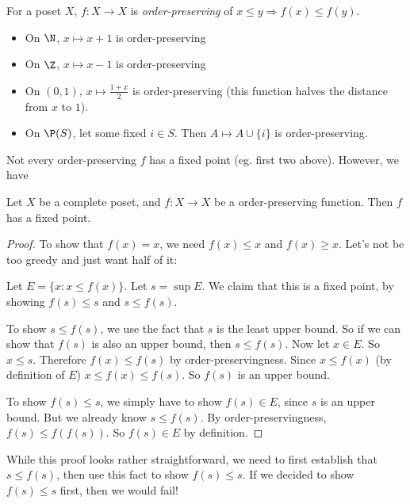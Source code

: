 \documentclass[a4paper]{article}
\begin{document}
\begin{defi}
  For a poset $X$, $f: X\to X$ is \emph{order-preserving} of $x \leq y \Rightarrow  f(x) \leq f(y)$.
\end{defi}

\begin{eg}\leavevmode
  \begin{itemize}
    \item On $\N$, $x\mapsto x + 1$ is order-preserving
    \item On $\Z$, $x\mapsto x - 1$ is order-preserving
    \item On $(0, 1)$, $x\mapsto \frac{1 + x}{2}$ is order-preserving (this function halves the distance from $x$ to $1$).
    \item On $\P(S)$, let some fixed $i\in S$. Then $A\mapsto A\cup \{i\}$ is order-preserving.
  \end{itemize}
\end{eg}
Not every order-preserving $f$ has a fixed point (eg. first two above). However, we have
\begin{thm}
  Let $X$ be a complete poset, and $f: X\to X$ be a order-preserving function. Then $f$ has a fixed point.
\end{thm}

\begin{proof}
  To show that $f(x) = x$, we need $f(x) \leq x$ and $f(x) \geq x$. Let's not be too greedy and just want half of it:

  Let $E = \{x: x \leq f(x)\}$. Let $s = \sup E$. We claim that this is a fixed point, by showing $f(s) \leq s$ and $s \leq f(s)$.

  To show $s \leq f(s)$, we use the fact that $s$ is the least upper bound. So if we can show that $f(s)$ is also an upper bound, then $s \leq f(s)$. Now let $x \in E$. So $x\leq s$. Therefore $f(x) \leq f(s)$ by order-preservingness. Since $x \leq f(x)$ (by definition of $E$) $x \leq f(x) \leq f(s)$. So $f(s)$ is an upper bound.

  To show $f(s) \leq s$, we simply have to show $f(s) \in E$, since $s$ is an upper bound. But we already know $s \leq f(s)$. By order-preservingness, $f(s) \leq f(f(s))$. So $f(s)\in E$ by definition.
\end{proof}
While this proof looks rather straightforward, we need to first establish that $s \leq f(s)$, then use this fact to show $f(s) \leq s$. If we decided to show $f(s) \leq s$ first, then we would fail!
\end{document}
